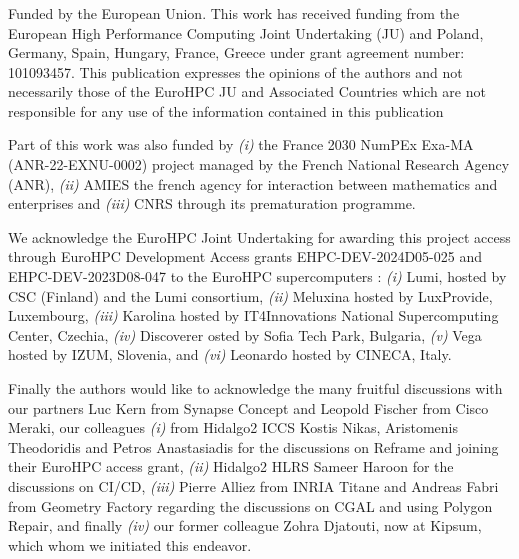 \documentclass[runningheads]{llncs}
\begin{document}
\begin{credits}
\subsubsection{\ackname} Funded  by  the  European  Union.  This  work  has  received  funding  from  the European  High  Performance  Computing  Joint  Undertaking  (JU)  and  Poland, Germany,  Spain,  Hungary,  France,  Greece  under  grant  agreement  number: 101093457. This  publication  expresses  the  opinions  of  the  authors  and  not  necessarily those of the EuroHPC JU and Associated Countries which are not responsible for any use of the information contained in this publication

Part of this work was also funded by \textit{(i)} the France 2030 NumPEx Exa-MA (ANR-22-EXNU-0002) project managed by the French National Research Agency (ANR), \textit{(ii)} AMIES the french agency for interaction between mathematics and enterprises and \textit{(iii)} CNRS through its prematuration programme.

We acknowledge the EuroHPC Joint Undertaking for awarding this project access through  EuroHPC Development Access grants EHPC-DEV-2024D05-025 and EHPC-DEV-2023D08-047 to the EuroHPC supercomputers : \textit{(i)} Lumi, hosted by CSC (Finland) and the Lumi consortium, \textit{(ii)} Meluxina hosted by LuxProvide, Luxembourg, \textit{(iii)} Karolina hosted by IT4Innovations National Supercomputing Center, Czechia, \textit{(iv)} Discoverer osted by Sofia Tech Park, Bulgaria, \textit{(v)} Vega hosted by IZUM, Slovenia, and \textit{(vi)} Leonardo hosted by CINECA, Italy.


Finally the authors would like to acknowledge the many fruitful discussions with our partners Luc Kern from Synapse Concept and Leopold Fischer from Cisco Meraki, our colleagues \textit{(i)} from Hidalgo2 ICCS Kostis Nikas, Aristomenis Theodoridis and Petros Anastasiadis for the discussions on Reframe and joining their EuroHPC access grant, \textit{(ii)} Hidalgo2 HLRS Sameer Haroon for the discussions on CI/CD, \textit{(iii)} Pierre Alliez from INRIA Titane and Andreas Fabri from Geometry Factory regarding the discussions on CGAL and using Polygon Repair, and finally \textit{(iv)} our former colleague Zohra Djatouti, now at Kipsum, which whom we initiated this endeavor. 


\end{credits}
\end{document}
